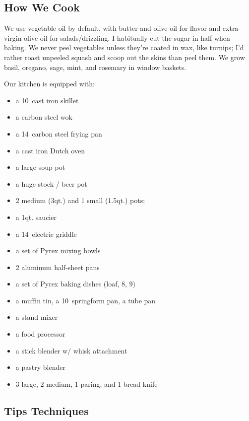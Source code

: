 
\subsection{How We Cook}
We use vegetable oil by default, with butter and olive oil for flavor and extra-virgin olive oil for salads/drizzling. I habitually cut the sugar in half when baking. We never peel vegetables unless they're coated in wax, like turnips; I'd rather roast unpeeled squash and scoop out the skins than peel them. We grow basil, oregano, sage, mint, and rosemary in window baskets.

Our kitchen is equipped with:
\begin{itemize}
  \item a 10\inch\ cast iron skillet
  \item a carbon steel wok
  \item a 14\inch\ carbon steel frying pan
  \item a cast iron Dutch oven
  \item a large soup pot
  \item a huge stock / beer pot
  \item 2 medium (3qt.) and 1 small (1.5qt.) pots;
  \item a 1qt. saucier
  \item a 14\inch\ electric griddle
  \item a set of Pyrex mixing bowls
 \item 2 aluminum half-sheet pans
 \item a set of Pyrex baking dishes (loaf, 8\inch{}\inch, 9\inch{}\inch)
 \item a muffin tin, a 10\inch\ springform pan, a tube pan
 \item a stand mixer
 \item a food processor
 \item a stick blender w/ whisk attachment
 \item a pastry blender
 \item 3 large, 2 medium, 1 paring, and 1 bread knife
\end{itemize}

\subsection{Tips \And Techniques}

